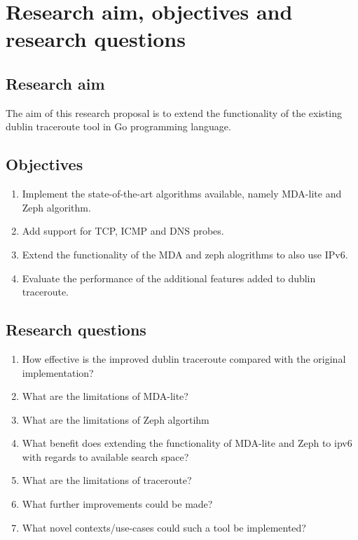 \section{Research aim, objectives and research questions}

\subsection{Research aim}
The aim of this research proposal is to extend the functionality of the existing dublin traceroute tool in Go programming language. 
\subsection{Objectives}
\begin{enumerate}
  \item Implement the state-of-the-art algorithms available, namely MDA-lite and Zeph algorithm. 
  \item Add support for TCP, ICMP and DNS probes. 
  \item Extend the functionality of the MDA and zeph alogrithms to also use IPv6.
  \item Evaluate the performance of the additional features added to dublin traceroute.
\end{enumerate}

\subsection{Research questions}
\begin{enumerate}
    \item How effective is the improved dublin traceroute compared with the original implementation?
    \item What are the limitations of MDA-lite?
    \item What are the limitations of Zeph algortihm
    \item What benefit does extending the functionality of MDA-lite and Zeph to ipv6 with regards to available search space?
    \item What are the limitations of traceroute?
    \item What further improvements could be made?
    \item What novel contexts/use-cases
 could such a tool be implemented?
\end{enumerate}